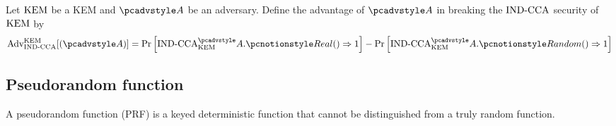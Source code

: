 \documentclass{article}
\begin{document}
\begin{definition}\label{def:kem-security}
    Let $\text{KEM}$ be a KEM and $\adv$ be an adversary. Define the advantage of $\adv$ in breaking the $\text{IND-CCA}$ security of $\text{KEM}$ by
    \[ \advantage{\indcca}{\KEM}[(\adv)] = \Pr\left[ \indcca_\KEM^\adv.\REAL() \Rightarrow 1 \right] - \Pr\left[ \indcca_\KEM^\adv.\RANDOM() \Rightarrow 1 \right] \]
    \begin{pchstack}[center,space=1em]
        \begin{pcvstack}[boxed]
        \end{pcvstack}
        \begin{pcvstack}[boxed]
        \end{pcvstack}
    \end{pchstack}
\end{definition}

\subsection{Pseudorandom function}\label{sec:prf}
A pseudorandom function (PRF) is a keyed deterministic function that cannot be distinguished from a truly random function.
\end{document}
